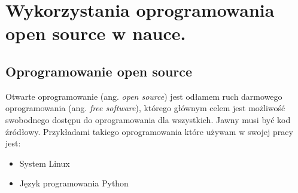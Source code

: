 \documentclass[a4paper, portrait,12pt]{mwrep}
\begin{document}
\newpage
\chapter{Wykorzystania oprogramowania open source w nauce.}
\section{Oprogramowanie open source}
Otwarte oprogramowanie (ang. \textit{open source}) jest odłamem ruch darmowego oprogramowania (ang. \textit{free software}), którego głównym celem jest możliwość swobodnego dostępu do oprogramowania dla wszystkich. Jawny musi być kod źródłowy. Przykładami takiego oprogramowania które używam w swojej pracy jest:
\begin{itemize}
\item System Linux
\item Język programowania Python
\end{itemize}
\end{document}
